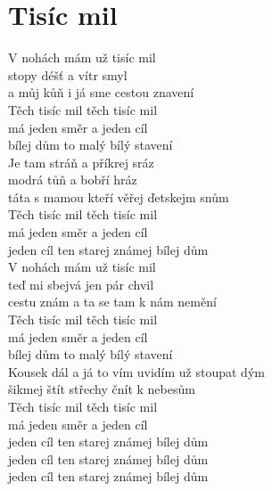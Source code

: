 \section{Tisíc mil}
\onehalfspacing

V nohách mám už tisíc mil\\
stopy déšť a vítr smyl\\
a můj kůň i já sme cestou znavení\\

Těch tisíc mil těch tisíc mil\\
má jeden směr a jeden cíl\\
bílej dům to malý bílý stavení\\

Je tam stráň a příkrej sráz\\
modrá tůň a bobří hráz\\
táta s mamou kteří věřej ďetskejm snům\\

Těch tisíc mil těch tisíc mil\\
má jeden směr a jeden cíl\\
jeden cíl ten starej známej bílej dům\\

V nohách mám už tisíc mil\\
teď mi sbejvá jen pár chvil\\
cestu znám a ta se tam k nám nemění\\

Těch tisíc mil těch tisíc mil\\
má jeden směr a jeden cíl\\
bílej dům to malý bílý stavení\\

Kousek dál a já to vím uvidím už stoupat dým\\
šikmej štít střechy čnít k nebesům \\

Těch tisíc mil těch tisíc mil\\
má jeden směr a jeden cíl\\
jeden cíl ten starej známej bílej dům\\
jeden cíl ten starej známej bílej dům\\
jeden cíl ten starej známej bílej dům \\
